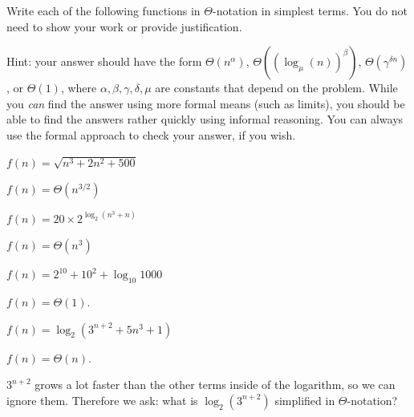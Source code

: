 \begin{prob}
    Write each of the following functions in $\Theta$-notation in simplest terms.
    You do not need to show your work or provide justification.

    Hint: your answer should have the form $\Theta(n^\alpha)$, $\Theta((\log_\mu(n))^\beta)$,
    $\Theta(\gamma^{\delta n})$, or $\Theta(1)$, where $\alpha, \beta, \gamma, \delta, \mu$ are
    constants that depend on the problem. While you \emph{can} find the answer
    using more formal means (such as limits), you should be able to find the
    answers rather quickly using informal reasoning. You can always use the
    formal approach to check your answer, if you wish.

    \begin{subprobset}

        \begin{subprob}
            $f(n) = \sqrt{n^3 + 2n^2 + 500}$

            \begin{soln}
                $f(n) = \Theta(n^{3/2})$
            \end{soln}
        \end{subprob}

        \begin{subprob}
            $f(n) = 20 \times 2^{\log_2 (n^3 + n) }$

            \begin{soln}
                $f(n) = \Theta(n^3)$
            \end{soln}
        \end{subprob}

        \begin{subprob}
            $f(n) = 2^{10} + 10^2 + \log_{10} 1000$

            \begin{soln}
                $f(n) = \Theta(1)$.
            \end{soln}
        \end{subprob}

        \begin{subprob}
            $f(n) = \log_2(3^{n+2} + 5n^3 + 1)$

            \begin{soln}
                $f(n) = \Theta(n)$.

                $3^{n+2}$ grows a lot faster than the other terms inside of the logarithm,
                so we can ignore them. Therefore we ask: what is $\log_2(3^{n+2})$ simplified
                in $\Theta$-notation?


\end{soln}
\end{subprob}
\end{subprobset}
\end{prob}
